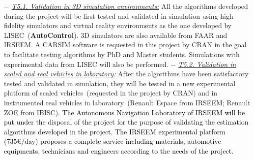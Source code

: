 \documentclass[a4paper,11pt]{article}
\begin{document}
\begin{itemize}[leftmargin=.2in,noitemsep,nolistsep]
\begin{tcolorbox}[breakable, enhanced,  colback=blue!2!white,
title = \bf Contributors$-$Deadlines$-$Objectives, coltitle= black, colbacktitle=brown!90!white, halign title=center]
\end{tcolorbox}

%
\subitem$-$ \underline{\it T5.1. Validation in 3D simulation environments:} All the algorithms developed during the project will be first tested and validated in simulation using high fidelity simulators and virtual reality environments as the one developed by LISEC~({\bf AutoControl}). 3D simulators are also available from FAAR and IRSEEM. A CARSIM software is requested in this project by CRAN in the goal to facilitate testing algorithms by PhD and Master students. Simulations with experimental data from LISEC will also be performed.
%
\subitem$-$  \underline{\it T5.2. Validation in scaled and real vehicles in laboratory:} After the algorithms have been satisfactory tested and validated in simulation, they will be tested in a new experimental platform of scaled vehicles~(requested in the project by CRAN) and in instrumented real vehicles in laboratory~(Renault Espace from IRSEEM; Renault ZOE from IBISC). \textcolor{black}{The Autonomous Navigation Laboratory of IRSEEM will be put under the disposal of the project for the purpose of validating the estimation algorithms developed in the project. The IRSEEM experimental platform (735\euro/day) proposes a complete service including materials, automotive equipments, technicians and engineers according to the needs of the project.}

\end{itemize}
\end{document}
